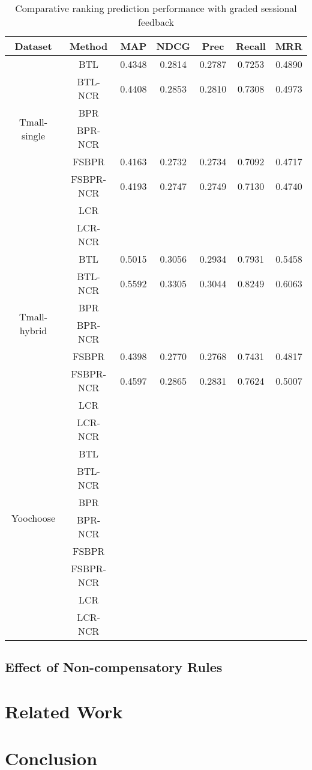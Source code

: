 \documentclass[letterpaper]{article} %
\begin{document}
\begin{table}[htp]
\tiny
\caption{Comparative ranking prediction performance with graded sessional feedback}
\begin{center}
\begin{tabular}{|c|c|c|c|c|c|c|}
\hline
Dataset & Method & MAP & NDCG & Prec & Recall & MRR \\\hline
\multirow{6}{*}{Tmall-single} & BTL &0.4348 &0.2814 &0.2787 &0.7253 &0.4890 \\\cline{2-7}
 & BTL-NCR &0.4408 &0.2853 &0.2810 &0.7308 &0.4973 \\\cline{2-7}
 & BPR & & & & & \\\cline{2-7}
 & BPR-NCR & & & & & \\\cline{2-7}
 & FSBPR &0.4163 &0.2732 &0.2734 &0.7092 &0.4717 \\\cline{2-7}
  & FSBPR-NCR &0.4193 &0.2747 &0.2749 &0.7130 &0.4740 \\\cline{2-7}
   & LCR & & & & & \\\cline{2-7}
 & LCR-NCR & & & & & \\\hline
\multirow{6}{*}{Tmall-hybrid} & BTL &0.5015 &0.3056 &0.2934 &0.7931 &0.5458 \\\cline{2-7}
 & BTL-NCR &0.5592 &0.3305 &0.3044 &0.8249 &0.6063 \\\cline{2-7}
 & BPR & & & & & \\\cline{2-7}
 & BPR-NCR & & & & & \\\cline{2-7}
 & FSBPR &0.4398 &0.2770 &0.2768 &0.7431 &0.4817 \\\cline{2-7}
  & FSBPR-NCR &0.4597 &0.2865 &0.2831 &0.7624 &0.5007 \\\cline{2-7}
   & LCR & & & & & \\\cline{2-7}
 & LCR-NCR & & & & & \\\hline
\multirow{6}{*}{Yoochoose} & BTL & & & & & \\\cline{2-7}
 & BTL-NCR & & & & & \\\cline{2-7}
 & BPR & & & & & \\\cline{2-7}
 & BPR-NCR & & & & & \\\cline{2-7}
 & FSBPR & & & & & \\\cline{2-7}
  & FSBPR-NCR & & & & & \\\cline{2-7}
   & LCR & & & & & \\\cline{2-7}
 & LCR-NCR & & & & & \\\hline
\end{tabular}
\end{center}
\label{tab:ratingresult}
\end{table}%


\subsection{Effect of Non-compensatory Rules}

\section{Related Work}\label{sec:relatedwork}

\section{Conclusion}\label{sec:conclusion}




\end{document}
